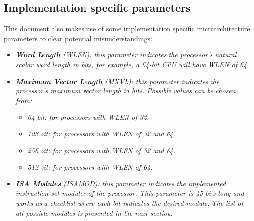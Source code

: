     \subsection[Implementation specific parameters]{Implementation specific parameters}

        \vspace{10pt}

        This document also makes use of some implementation specific microarchitecture parameters to clear potential misunderstandings:

        \begin{itemize}

            \item \textit{\textbf{Word Length} (WLEN): this parameter indicates the processor's natural scalar word length in bits, for example, a 64-bit CPU will have WLEN of 64.}

            \item \textit{\textbf{Maximum Vector Length} (MXVL): this parameter indicates the processor's maximum vector length in bits. Possible values can be chosen from:}

                \begin{itemize}

                    \item \textit{64 bit: for processors with WLEN of 32.}
                    \item \textit{128 bit: for processors with WLEN of 32 and 64.}
                    \item \textit{256 bit: for processors with WLEN of 32 and 64.}
                    \item \textit{512 bit: for processors with WLEN of 64.}

                \end{itemize}

            \item \textit{\textbf{ISA Modules} (ISAMOD): this parameter indicates the implemented instruction set modules of the processor. This parameter is 45 bits long and works as a checklist where each bit indicates the desired module. The list of all possible modules is presented in the next section.}

        \end{itemize}

